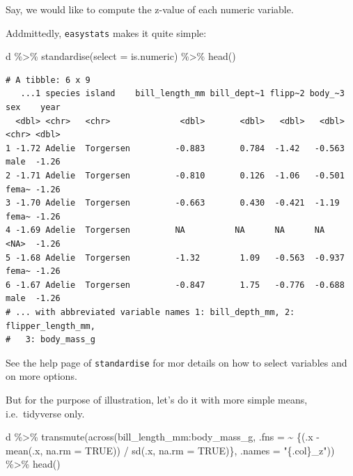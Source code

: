 \documentclass[
  letterpaper,
  DIV=11,
  numbers=noendperiod]{scrreprt}
\newenvironment{Shaded}{\begin{snugshade}}{\end{snugshade}}
\newcommand{\AttributeTok}[1]{\textcolor[rgb]{0.40,0.45,0.13}{#1}}
\newcommand{\ConstantTok}[1]{\textcolor[rgb]{0.56,0.35,0.01}{#1}}
\newcommand{\FunctionTok}[1]{\textcolor[rgb]{0.28,0.35,0.67}{#1}}
\newcommand{\NormalTok}[1]{\textcolor[rgb]{0.00,0.23,0.31}{#1}}
\newcommand{\SpecialCharTok}[1]{\textcolor[rgb]{0.37,0.37,0.37}{#1}}
\newcommand{\StringTok}[1]{\textcolor[rgb]{0.13,0.47,0.30}{#1}}
\theoremstyle{definition}
\theoremstyle{definition}
\theoremstyle{remark}
\begin{document}
Say, we would like to compute the z-value of each numeric variable.

Addmittedly, \texttt{easystats} makes it quite simple:

\begin{Shaded}
\begin{Highlighting}[]
\NormalTok{d }\SpecialCharTok{\%\textgreater{}\%} 
  \FunctionTok{standardise}\NormalTok{(}\AttributeTok{select =}\NormalTok{ is.numeric) }\SpecialCharTok{\%\textgreater{}\%} 
  \FunctionTok{head}\NormalTok{()}
\end{Highlighting}
\end{Shaded}

\begin{verbatim}
# A tibble: 6 x 9
   ...1 species island    bill_length_mm bill_dept~1 flipp~2 body_~3 sex    year
  <dbl> <chr>   <chr>              <dbl>       <dbl>   <dbl>   <dbl> <chr> <dbl>
1 -1.72 Adelie  Torgersen         -0.883       0.784  -1.42   -0.563 male  -1.26
2 -1.71 Adelie  Torgersen         -0.810       0.126  -1.06   -0.501 fema~ -1.26
3 -1.70 Adelie  Torgersen         -0.663       0.430  -0.421  -1.19  fema~ -1.26
4 -1.69 Adelie  Torgersen         NA          NA      NA      NA     <NA>  -1.26
5 -1.68 Adelie  Torgersen         -1.32        1.09   -0.563  -0.937 fema~ -1.26
6 -1.67 Adelie  Torgersen         -0.847       1.75   -0.776  -0.688 male  -1.26
# ... with abbreviated variable names 1: bill_depth_mm, 2: flipper_length_mm,
#   3: body_mass_g
\end{verbatim}

See the help page of \texttt{standardise} for mor details on how to
select variables and on more options.

But for the purpose of illustration, let's do it with more simple means,
i.e.~tidyverse only.

\begin{Shaded}
\begin{Highlighting}[]
\NormalTok{d }\SpecialCharTok{\%\textgreater{}\%} 
  \FunctionTok{transmute}\NormalTok{(}\FunctionTok{across}\NormalTok{(bill\_length\_mm}\SpecialCharTok{:}\NormalTok{body\_mass\_g, }
                \AttributeTok{.fns =} \SpecialCharTok{\textasciitilde{}}\NormalTok{ \{(.x }\SpecialCharTok{{-}} \FunctionTok{mean}\NormalTok{(.x, }\AttributeTok{na.rm =} \ConstantTok{TRUE}\NormalTok{)) }\SpecialCharTok{/} \FunctionTok{sd}\NormalTok{(.x, }\AttributeTok{na.rm =} \ConstantTok{TRUE}\NormalTok{)\},}
                \AttributeTok{.names =} \StringTok{"\{.col\}\_z"}\NormalTok{)) }\SpecialCharTok{\%\textgreater{}\%} 
  \FunctionTok{head}\NormalTok{()}
\end{Highlighting}
\end{Shaded}
\end{document}
